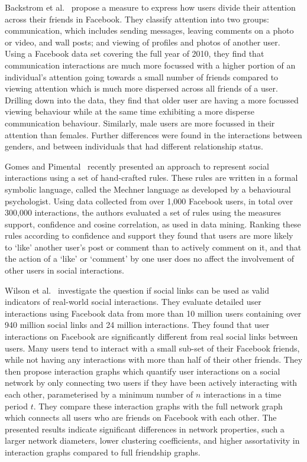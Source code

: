 \documentclass[letterpaper]{article}
\begin{document}
Backstrom et al.~\cite{backstrom2011center} propose a measure to express how users divide their attention across their friends in Facebook. They classify attention into two groups: communication, which includes sending messages, leaving comments on a photo or video, and wall posts; and viewing of profiles and photos of another user. Using a Facebook data set covering the full year of 2010, they find that communication interactions are much more focussed with a higher portion of an individual's attention going towards a small number of friends compared to viewing attention which is much more dispersed across all friends of a user. Drilling down into the data, they find that older user are having a more focussed viewing behaviour while at the same time exhibiting a more disperse communication behaviour. Similarly, male users are more focussed in their attention than females. Further differences were found in the interactions between genders, and between individuals that had different relationship status.




Gomes and Pimental~\cite{gomes2011social} recently presented an approach to represent social interactions using a set of hand-crafted rules. These rules are written in a formal symbolic language, called the Mechner language as developed by a behavioural psychologist. Using data collected from over 1,000 Facebook users, in total over 300,000 interactions, the authors evaluated a set of rules using the measures support, confidence and cosine correlation, as used in data mining. Ranking these rules according to confidence and support they found that users are more likely to `like' another user's post or comment than to actively comment on it, and that the action of a `like' or `comment' by one user does no affect the involvement of other users in social interactions.




Wilson et al.~\cite{wilson2009user} investigate the question if social links can be used as valid indicators of real-world social interactions. They evaluate detailed user interactions using Facebook data from more than 10 million users containing over 940 million social links and 24 million interactions. They found that user interactions on Facebook are significantly different from real social links between users. Many users tend to interact with a small sub-set of their Facebook friends, while not having any interactions with more than half of their other friends. They then propose interaction graphs which quantify user interactions on a social network by only connecting two users if they have been actively interacting with each other, parameterised by a minimum number of $n$ interactions in a time period $t$. They compare these interaction graphs with the full network graph which connects all users who are friends on Facebook with each other. The presented results indicate significant differences in network properties, such a larger network diameters, lower clustering coefficients, and higher assortativity in interaction graphs compared to full friendship graphs.
\end{document}
